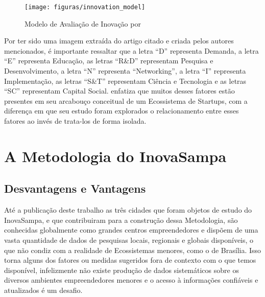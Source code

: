 \begin{figure}[!htb]
\centering
\texttt{[image: figuras/innovation\_model]}
\caption{Modelo de Avaliação de Inovação por }
\label{figure:innovation_model}
\end{figure}

Por ter sido uma imagem extraída do artigo citado e criada pelos autores mencionados, é importante ressaltar que a letra ``D'' representa Demanda, a letra ``E'' representa Educação, as letras ``R\&D'' representam Pesquisa e Desenvolvimento, a letra ``N'' representa ``Networking'', a letra ``I'' representa Implementação, as letras ``S\&T'' representam Ciência e Tecnologia e as letras ``SC'' representam Capital Social.  enfatiza que muitos desses fatores estão presentes em seu arcabouço conceitual de um Ecossistema de Startups, com a diferença em que seu estudo foram explorados o relacionamento entre esses fatores ao invés de trata-los de forma isolada.

\section{A Metodologia do InovaSampa}
\label{section:metodologia_do_inovasampa}

\subsection{Desvantagens e Vantagens}
\label{subsection:vantagens_e_desvantagens}

Até a publicação deste trabalho as três cidades que foram objetos de estudo do InovaSampa, e que contribuiram para a construção dessa Metodologia, são conhecidas globalmente como grandes centros empreendedores e dispõem de uma vasta quantidade de dados de pesquisas locais, regionais e globais disponíveis, o que não condiz com a realidade de Ecossistemas menores, como o de Brasília. Isso torna alguns dos fatores ou medidas sugeridos fora de contexto com o que temos disponível, infelizmente não existe produção de dados sistemáticos sobre os diversos ambientes empreendedores menores e o acesso à informações confiáveis e atualizados é um desafio.


